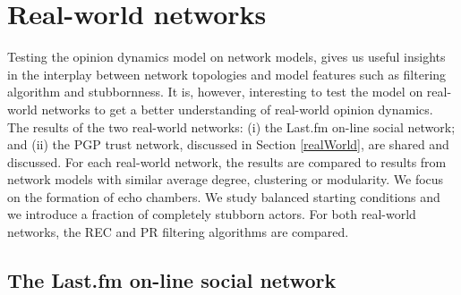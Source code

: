 \documentclass[11 pt , letterpaper , twoside , openright]{book}
\begin{document}
\section{Real-world networks}

Testing the opinion dynamics model on network models, gives us useful insights in the interplay between network topologies and model features such as filtering algorithm and stubbornness. It is, however, interesting to test the model on real-world networks to get a better understanding of real-world opinion dynamics.\\
\newline
The results of the two real-world networks: (i) the Last.fm on-line social network; and (ii) the PGP trust network, discussed in Section \ref{realWorld}, are shared and discussed. For each real-world network, the results are compared to results from network models with similar average degree, clustering or modularity. We focus on the formation of echo chambers. We study balanced starting conditions and we introduce a fraction of completely stubborn actors. For both real-world networks, the REC and PR filtering algorithms are compared.

\subsection{The Last.fm on-line social network}
\end{document}

